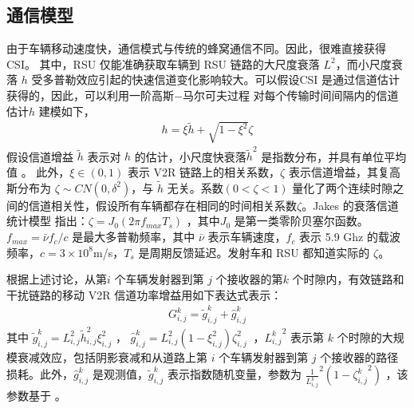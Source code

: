 \subsection{通信模型}\label{section3-2-1}
由于车辆移动速度快，通信模式与传统的蜂窝通信不同。因此，很难直接获得 CSI。 其中，RSU 仅能准确获取车辆到 RSU 链路的大尺度衰落 $L^2$，而小尺度衰落 $h$ 受多普勒效应引起的快速信道变化影响较大。可以假设CSI 是通过信道估计获得的，因此，可以利用一阶高斯$-$马尔可夫过程 \supercite{Kim2011} 对每个传输时间间隔内的信道估计$h$ 建模如下，%
\begin{eqnarray}\label{E1}
h=\xi{\widetilde{h}}+\sqrt{1-\xi^2}\zeta
\end{eqnarray}
假设信道增益 $\widetilde{h}$ 表示对 $h$ 的估计，小尺度快衰落${\widetilde{h}}^2$ 是指数分布，并具有单位平均值 \supercite{Sakr2014}。 此外，$\xi\in\left(0,1\right)$ 表示 V2R 链路上的相关系数，$\zeta$ 表示信道增益，其复高斯分布为 $\zeta\sim CN\left(0,\delta^2\right)$，与 $\widetilde{h}$ 无关。系数$\left(0<\zeta<1\right)$ 量化了两个连续时隙之间的信道相关性，假设所有车辆都存在相同的时间相关系数$\zeta$。Jakes 的衰落信道统计模型 \supercite{Kim2011} 指出：$\zeta=J_0\left(2\pi f_{max}T_s\right)$ ，其中$J_0$ 是第一类零阶贝塞尔函数。$f_{max}=\bar{\nu}f_c/c $ 是最大多普勒频率，其中 $\bar{\nu}$ 表示车辆速度，$f_c$ 表示 5.9 Ghz 的载波频率，$c=3\times{10}^8$m/s，$T_s$ 是周期反馈延迟。发射车和 RSU 都知道实际的 $\zeta$。

根据上述讨论，从第$ i$ 个车辆发射器到第 $j $ 个接收器的第$ k $ 个时隙内，有效链路和干扰链路的移动 V2R 信道功率增益用如下表达式表示：
\begin{eqnarray}\label{E2}
G_{i,j}^k={\widetilde{g}}_{i,j}^k+{\hat{g}}_{i,j}^k
\end{eqnarray}
其中 ${\widetilde{g}}_{i,j}^k=L_{i,j}^2{\widetilde{h}}_{i,j}^2\xi_{i,j}^2$ ， ${\hat{g}}_{i,j}^k=L_{i,j}^2\left(1-\xi_{i,j}^2\right)\zeta_{i,j}^2\ $ ，$ {L_{i,j}^k}^2 $
表示第 $k $ 个时隙的大规模衰减效应，包括阴影衰减和从道路上第 $i$ 个车辆发射器到第 $ j $ 个接收器的路径损耗。此外，${\hat{g}}_{i,j}^k$ 是观测值，${\widetilde{g}}_{i,j}^k$ 表示指数随机变量，参数为 $\frac{1}{L_{i,j}^k}^2({1-{\zeta_{i,j}^k}^2}) $ ，该参数基于 \cite{Xie2020}。

